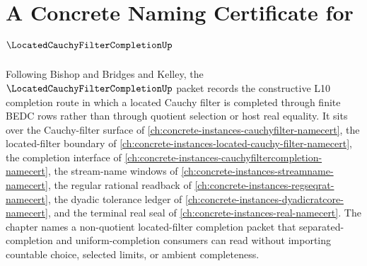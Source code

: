 \chapter{A Concrete Naming Certificate for $\LocatedCauchyFilterCompletionUp$}
\label{ch:concrete-instances-located-cauchy-filter-completion-namecert}

Following Bishop and Bridges and Kelley, the $\LocatedCauchyFilterCompletionUp$ packet records the constructive L10 completion route in which a located Cauchy filter is completed through finite BEDC rows rather than through quotient selection or host real equality. It sits over the Cauchy-filter surface of \autoref{ch:concrete-instances-cauchyfilter-namecert}, the located-filter boundary of \autoref{ch:concrete-instances-located-cauchy-filter-namecert}, the completion interface of \autoref{ch:concrete-instances-cauchyfiltercompletion-namecert}, the stream-name windows of \autoref{ch:concrete-instances-streamname-namecert}, the regular rational readback of \autoref{ch:concrete-instances-regseqrat-namecert}, the dyadic tolerance ledger of \autoref{ch:concrete-instances-dyadicratcore-namecert}, and the terminal real seal of \autoref{ch:concrete-instances-real-namecert}. The chapter names a non-quotient located-filter completion packet that separated-completion and uniform-completion consumers can read without importing countable choice, selected limits, or ambient completeness.

